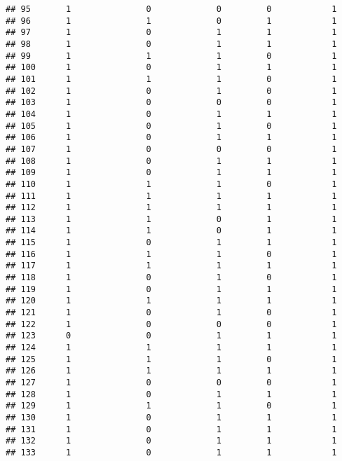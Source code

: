 \documentclass[]{article}
\begin{document}
\begin{verbatim}
## 95       1               0             0         0            1
## 96       1               1             0         1            1
## 97       1               0             1         1            1
## 98       1               0             1         1            1
## 99       1               1             1         0            1
## 100      1               0             1         1            1
## 101      1               1             1         0            1
## 102      1               0             1         0            1
## 103      1               0             0         0            1
## 104      1               0             1         1            1
## 105      1               0             1         0            1
## 106      1               0             1         1            1
## 107      1               0             0         0            1
## 108      1               0             1         1            1
## 109      1               0             1         1            1
## 110      1               1             1         0            1
## 111      1               1             1         1            1
## 112      1               1             1         1            1
## 113      1               1             0         1            1
## 114      1               1             0         1            1
## 115      1               0             1         1            1
## 116      1               1             1         0            1
## 117      1               1             1         1            1
## 118      1               0             1         0            1
## 119      1               0             1         1            1
## 120      1               1             1         1            1
## 121      1               0             1         0            1
## 122      1               0             0         0            1
## 123      0               0             1         1            1
## 124      1               1             1         1            1
## 125      1               1             1         0            1
## 126      1               1             1         1            1
## 127      1               0             0         0            1
## 128      1               0             1         1            1
## 129      1               1             1         0            1
## 130      1               0             1         1            1
## 131      1               0             1         1            1
## 132      1               0             1         1            1
## 133      1               0             1         1            1

\end{verbatim}
\end{document}
